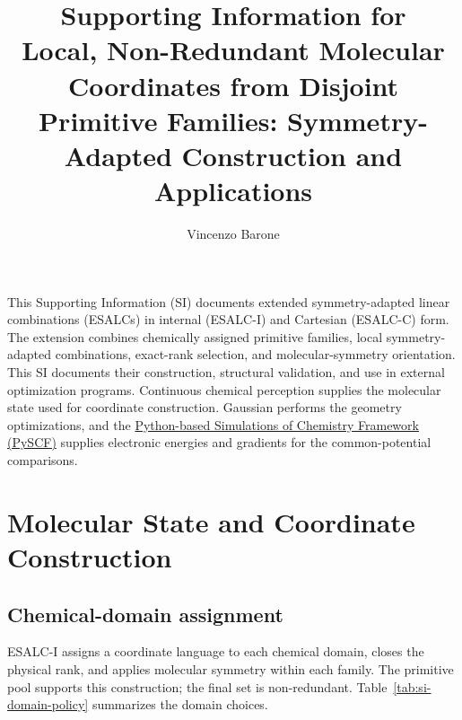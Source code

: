\documentclass[10pt]{article}
\title{Supporting Information for\\
Local, Non-Redundant Molecular Coordinates from Disjoint Primitive Families: Symmetry-Adapted Construction and Applications}
\author{Vincenzo Barone}
\date{}
\begin{document}
\maketitle
\tableofcontents

{This Supporting Information (SI) documents extended symmetry-adapted linear combinations
(ESALCs) in internal (ESALC-I) and Cartesian (ESALC-C) form. The extension
combines chemically assigned primitive families, local symmetry-adapted
combinations, exact-rank selection, and molecular-symmetry orientation. This
SI documents their construction, structural validation, and use in external
optimization programs.  Continuous chemical perception supplies the molecular state used for
coordinate construction.\cite{Barone2026Perception}}
{Gaussian\cite{GaussianGICManual} performs the geometry
optimizations, and the \href{https://pyscf.org/}{Python-based Simulations
of Chemistry Framework (PySCF)} supplies electronic energies and gradients
for the common-potential comparisons.}

\section{Molecular State and Coordinate Construction}

\subsection{Chemical-domain assignment}

{ESALC-I assigns a coordinate language to each chemical domain,
closes the physical rank, and applies molecular symmetry within each family.
The primitive pool supports this construction; the final set is non-redundant.
Table~\ref{tab:si-domain-policy} summarizes the
domain choices.}
\end{document}
